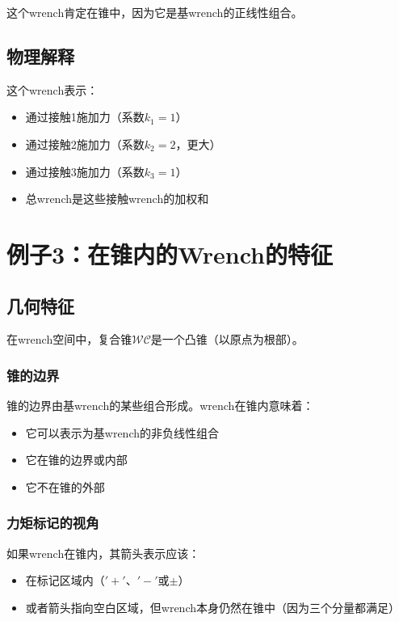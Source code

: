 \documentclass[12pt,a4paper]{article}
\begin{document}
这个wrench肯定在锥中，因为它是基wrench的正线性组合。

\subsection{物理解释}

这个wrench表示：
\begin{itemize}
    \item 通过接触1施加力（系数$k_1 = 1$）
    \item 通过接触2施加力（系数$k_2 = 2$，更大）
    \item 通过接触3施加力（系数$k_3 = 1$）
    \item 总wrench是这些接触wrench的加权和
\end{itemize}

\section{例子3：在锥内的Wrench的特征}

\subsection{几何特征}

在wrench空间中，复合锥$\mathcal{WC}$是一个凸锥（以原点为根部）。

\subsubsection{锥的边界}

锥的边界由基wrench的某些组合形成。wrench在锥内意味着：
\begin{itemize}
    \item 它可以表示为基wrench的非负线性组合
    \item 它在锥的边界或内部
    \item 它不在锥的外部
\end{itemize}

\subsubsection{力矩标记的视角}

如果wrench在锥内，其箭头表示应该：
\begin{itemize}
    \item 在标记区域内（$'+'$、$'-'$或$\pm$）
    \item 或者箭头指向空白区域，但wrench本身仍然在锥中（因为三个分量都满足）
\end{itemize}
\end{document}
